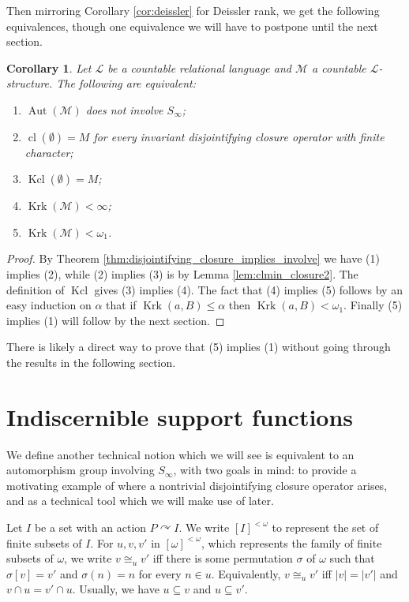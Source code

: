 \documentclass[12pt]{amsart}
\theoremstyle{plain}
\newtheorem{corollary}[theorem]{Corollary}
\theoremstyle{definition}
\newcommand{\isom}{\cong}
\newcommand{\mcL}{\mathcal{L}}
\newcommand{\mcM}{\mathcal{M}}
\DeclareMathOperator{\Aut}{Aut}
\DeclareMathOperator{\cl}{cl}
\DeclareMathOperator{\clmin}{Kcl}
\DeclareMathOperator{\Krk}{Krk}
\begin{document}
Then mirroring Corollary \ref{cor:deissler} for Deissler rank, we get the following equivalences, though one equivalence we will have to postpone until the next section.

\begin{corollary}\label{cor:equivalences}
Let $\mcL$ be a countable relational language and $\mcM$ a countable $\mcL$-structure. The following are equivalent:
\begin{enumerate}
\item $\Aut(\mcM)$ does not involve $S_\infty$;
\item $\cl(\emptyset) = M$ for every invariant disjointifying closure operator with finite character;
\item $\clmin(\emptyset) = M$;
\item $\Krk(\mcM) < \infty$;
\item $\Krk(\mcM) < \omega_1$.
\end{enumerate}
\end{corollary}

\begin{proof}
By Theorem \ref{thm:disjointifying_closure_implies_involve} we have (1) implies (2), while (2) implies (3) is by Lemma \ref{lem:clmin_closure2}.
The definition of $\clmin$ gives (3) implies (4).
The fact that (4) implies (5) follows by an easy induction on $\alpha$ that if $\Krk(a, B) \le \alpha$ then $\Krk(a, B) < \omega_1$.
Finally (5) implies (1) will follow by the next section.
\end{proof}

There is likely a direct way to prove that (5) implies (1) without going through the results in the following section.

\section{Indiscernible support functions}

We define another technical notion which we will see is equivalent to an automorphism group involving $S_\infty$, with two goals in mind: to provide a motivating example of where a nontrivial disjointifying closure operator arises, and as a technical tool which we will make use of later.

Let $I$ be a set with an action $P \curvearrowright I$.
We write $[I]^{<\omega}$ to represent the set of finite subsets of $I$.
For $u, v, v'$ in $[\omega]^{<\omega}$, which represents the family of finite subsets of $\omega$, we write $v \isom_u v'$ iff there is some permutation $\sigma$ of $\omega$ such that $\sigma[v] = v'$ and $\sigma(n) = n$ for every $n \in u$.
Equivalently, $v \isom_u v'$ iff $|v| = |v'|$ and $v \cap u = v' \cap u$. Usually, we have $u \subseteq v$ and $u \subseteq v'$.
\end{document}
